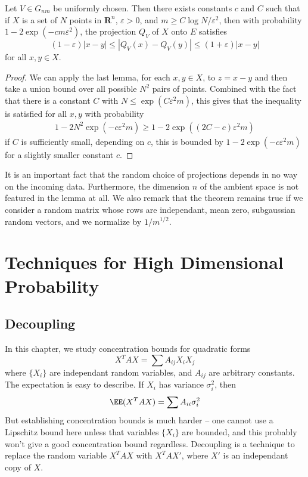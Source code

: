 \begin{theorem}
    Let $V \in G_{nm}$ be uniformly chosen. Then there exists constants $c$ and $C$ such that if $X$ is a set of $N$ points in $\mathbf{R}^n$, $\varepsilon > 0$, and $m \geq C \log N / \varepsilon^2$, then with probability $1 - 2 \exp(-c m \varepsilon^2)$, the projection $Q_V$ of $X$ onto $E$ satisfies
    \[ (1 - \varepsilon)|x-y| \leq | Q_V(x) - Q_V(y) | \leq (1 + \varepsilon) |x - y| \]
    for all $x,y \in X$.
\end{theorem}
\begin{proof}
    We can apply the last lemma, for each $x,y \in X$, to $z = x-y$ and then take a union bound over all possible $N^2$ pairs of points. Combined with the fact that there is a constant $C$ with $N \leq \exp(C \varepsilon^2 m)$, this gives that the inequality is satisfied for all $x,y$ with probability
    \begin{align*}
        1 - 2 N^2 \exp(-c \varepsilon^2 m) \geq 1 - 2 \exp((2C - c) \varepsilon^2 m)
    \end{align*}
    if $C$ is sufficiently small, depending on $c$, this is bounded by $1 - 2 \exp(-c\varepsilon^2 m)$ for a slightly smaller constant $c$.
\end{proof}

\begin{remark}
    It is an important fact that the random choice of projections depends in no way on the incoming data. Furthermore, the dimension $n$ of the ambient space is not featured in the lemma at all. We also remark that the theorem remains true if we consider a random matrix whose rows are independant, mean zero, subgaussian random vectors, and we normalize by $1/m^{1/2}$.
\end{remark}








\chapter{Techniques for High Dimensional Probability}


\section{Decoupling}

In this chapter, we study concentration bounds for quadratic forms
%
\[ X^T A X = \sum A_{ij} X_i X_j \]
%
where $\{ X_i \}$ are independant random variables, and $A_{ij}$ are arbitrary constants. The expectation is easy to describe. If $X_i$ has variance $\sigma_i^2$, then
%
\[ \EE(X^T A X) = \sum A_{ii} \sigma_i^2 \]
%
But establishing concentration bounds is much harder -- one cannot use a Lipschitz bound here unless that variables $\{ X_i \}$ are bounded, and this probably won't give a good concentration bound regardless. Decoupling is a technique to replace the random variable $X^T AX$ with $X^T A X'$, where $X'$ is an independant copy of $X$.

